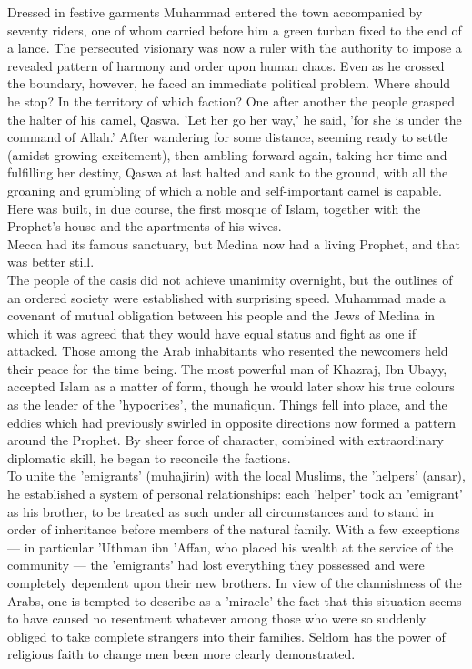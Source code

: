 \documentclass[10pt, twoside,openright]{book}
\begin{document}
Dressed in festive garments Muhammad entered the town accompanied by seventy riders, one of whom 
carried before him a green turban fixed to the end of a lance. The persecuted visionary was now a 
ruler with the authority to impose a revealed pattern of harmony and order upon human chaos. Even as 
he crossed the boundary, however, he faced an immediate political problem. Where should he stop? In 
the territory of which faction? One after another the people grasped the halter of his camel, Qaswa. 
'Let her go her way,' he said, 'for she is under the command of Allah.' After wandering for some 
distance, seeming ready to settle (amidst growing excitement), then ambling forward again, taking her 
time and fulfilling her destiny, Qaswa at last halted and sank to the ground, with all the groaning 
and grumbling of which a noble and self\hyp{}important camel is capable. Here was built, in due course, 
the first mosque of Islam, together with the Prophet's house and the apartments of his wives. \\

Mecca had its famous sanctuary, but Medina now had a living Prophet, and that was better still. \\

The people of the oasis did not achieve unanimity overnight, but the outlines of an ordered society 
were established with surprising speed. Muhammad made a covenant of mutual obligation between his 
people and the Jews of Medina in which it was agreed that they would have equal status and fight as 
one if attacked. Those among the Arab inhabitants who resented the newcomers held their peace for the 
time being. The most powerful man of Khazraj, Ibn Ubayy, accepted Islam as a matter of form, though 
he would later show his true colours as the leader of the 'hypocrites', the munafiqun. Things fell 
into place, and the eddies which had previously swirled in opposite directions now formed a pattern 
around the Prophet. By sheer force of character, combined with extraordinary diplomatic skill, he 
began to reconcile the factions. \\

To unite the 'emigrants' (muhajirin) with the local Muslims, the 'helpers' (ansar), he established a 
system of personal relationships: each 'helper' took an 'emigrant' as his brother, to be treated as 
such under all circumstances and to stand in order of inheritance before members of the natural 
family. With a few exceptions --- in particular 'Uthman ibn 'Affan, who placed his wealth at the 
service of the community --- the 'emigrants' had lost everything they possessed and were completely 
dependent upon their new brothers. In view of the clannishness of the Arabs, one is tempted to 
describe as a 'miracle' the fact that this situation seems to have caused no resentment whatever 
among those who were so suddenly obliged to take complete strangers into their families. Seldom has 
the power of religious faith to change men been more clearly demonstrated. \\
\end{document}
